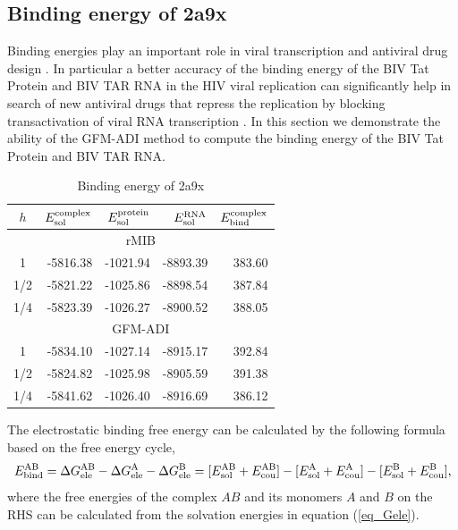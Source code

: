 \subsection{Binding energy of 2a9x}
Binding energies play an important role in viral transcription and antiviral drug design \cite{drug2}. In particular a better accuracy of the binding energy of the BIV Tat Protein and BIV TAR RNA in the HIV viral replication can significantly help in search of new antiviral drugs that repress the replication by blocking transactivation of viral RNA transcription \cite{Leeper2005}. In this section we demonstrate the ability of the GFM-ADI method to compute the binding energy of the BIV Tat Protein and BIV TAR RNA. 

\begin{table}[H]
\centering
\begin{tabular}{crrrr}
\hline
$h$ & $E_{\rm sol}^{\rm complex}$ & $E_{\rm sol}^{\rm protein}$ & $E_{\rm sol}^{\rm RNA}$ & $E_{\rm bind}^{\rm complex}$ \\ \hline
\multicolumn{5}{c}{rMIB}  \\ \hline
1   & -5816.38 & -1021.94 & -8893.39 & 383.60 \\
1/2 & -5821.22 & -1025.86 & -8898.54 & 387.84 \\
1/4 & -5823.39 & -1026.27 & -8900.52 & 388.05 \\ \hline
\multicolumn{5}{c}{GFM-ADI}  				  \\ \hline
1   & -5834.10 & -1027.14 & -8915.17 & 392.84 \\
1/2 & -5824.82 & -1025.98 & -8905.59 & 391.38 \\
1/4 & -5841.62 & -1026.40 & -8916.69 & 386.12 \\ \hline
\end{tabular}
\caption{Binding energy of 2a9x}
\label{tab_2a9x}
\end{table}

The electrostatic binding free energy can be calculated by the following formula based on the free energy cycle,
\begin{equation}
	E^{\rm AB}_{\rm bind}=\Delta G^{\rm AB}_{\rm ele}-\Delta G^{\rm A}_{\rm ele}-\Delta G^{\rm B}_{\rm ele}\label{eq_bind} =[E^{\rm AB}_{\rm sol}+E^{\rm AB}_{\rm cou}]-[E^{\rm A}_{\rm sol}+E^{\rm A}_{\rm cou}]-[E^{\rm B}_{\rm sol}+E^{\rm B}_{\rm cou}],
\end{equation}
where the free energies of the complex $AB$ and its monomers $A$ and $B$ on the RHS can be calculated from the solvation energies in equation (\ref{eq_Gele}). 

